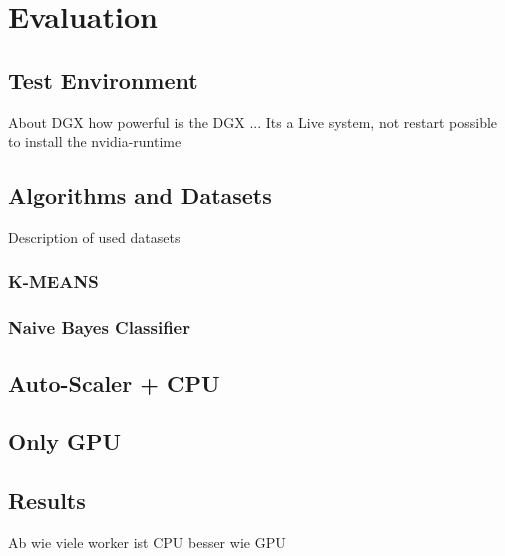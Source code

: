\chapter{Evaluation}
\label{chap:07_evaluation}
%

\section{Test Environment}
About DGX how powerful is the DGX ...
Its a Live system, not restart possible to install the nvidia-runtime

\section{Algorithms and Datasets}
Description of used datasets


\subsection{K-MEANS}


\subsection{Naive Bayes Classifier}


\section{Auto-Scaler + CPU}


\section{Only GPU}


\section{Results}
Ab wie viele worker ist CPU besser wie GPU

